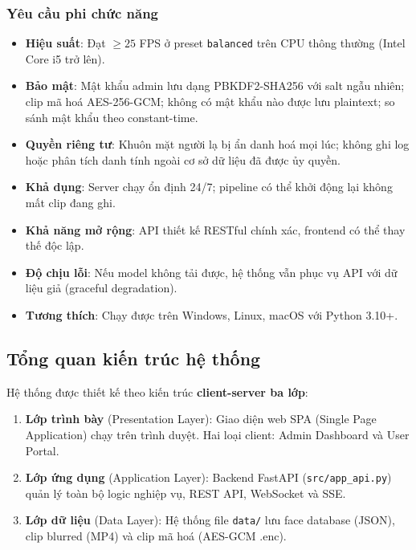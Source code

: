 \subsubsection{Yêu cầu phi chức năng}
\label{subsubsec:ycphi}

\begin{itemize}
    \item \textbf{Hiệu suất}: Đạt $\geq 25$ FPS ở preset \texttt{balanced} trên CPU thông thường (Intel Core i5 trở lên).
    \item \textbf{Bảo mật}: Mật khẩu admin lưu dạng PBKDF2-SHA256 với salt ngẫu nhiên; clip mã hoá AES-256-GCM; không có mật khẩu nào được lưu plaintext; so sánh mật khẩu theo constant-time.
    \item \textbf{Quyền riêng tư}: Khuôn mặt người lạ bị ẩn danh hoá mọi lúc; không ghi log hoặc phân tích danh tính ngoài cơ sở dữ liệu đã được ủy quyền.
    \item \textbf{Khả dụng}: Server chạy ổn định 24/7; pipeline có thể khởi động lại không mất clip đang ghi.
    \item \textbf{Khả năng mở rộng}: API thiết kế RESTful chính xác, frontend có thể thay thế độc lập.
    \item \textbf{Độ chịu lỗi}: Nếu model không tải được, hệ thống vẫn phục vụ API với dữ liệu giả (graceful degradation).
    \item \textbf{Tương thích}: Chạy được trên Windows, Linux, macOS với Python 3.10+.
\end{itemize}

\subsection{Tổng quan kiến trúc hệ thống}
\label{subsec:kientruc}

Hệ thống được thiết kế theo kiến trúc \textbf{client-server ba lớp}:

\begin{enumerate}[1.]
    \item \textbf{Lớp trình bày} (Presentation Layer): Giao diện web SPA (Single Page Application) chạy trên trình duyệt. Hai loại client: Admin Dashboard và User Portal.
    \item \textbf{Lớp ứng dụng} (Application Layer): Backend FastAPI (\texttt{src/app\_api.py}) quản lý toàn bộ logic nghiệp vụ, REST API, WebSocket và SSE.
    \item \textbf{Lớp dữ liệu} (Data Layer): Hệ thống file \texttt{data/} lưu face database (JSON), clip blurred (MP4) và clip mã hoá (AES-GCM .enc).
\end{enumerate}

